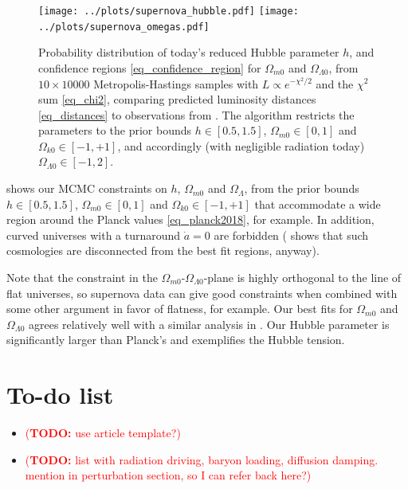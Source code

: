 \documentclass[10pt,a4paper]{article}
\newcommand\TODO[1]{\textcolor{red}{(\textbf{TODO:} #1)}}
\begin{document}
\begin{figure}[bh!]
	\centering
	\texttt{[image: ../plots/supernova\_hubble.pdf]}
	\texttt{[image: ../plots/supernova\_omegas.pdf]}
	\caption{%
		Probability distribution of today's reduced Hubble parameter $h$,
		and confidence regions \eqref{eq_confidence_region} for $\Omega_{m0}$ and $\Omega_{\Lambda0}$,
		from $10 \times 10000$ Metropolis-Hastings samples with $L \propto e^{-\chi^2/2}$ and the $\chi^2$ sum \eqref{eq_chi2},
		comparing predicted luminosity distances \eqref{eq_distances} to observations from \cite{betouleImprovedCosmologicalConstraints2014}.
		The algorithm restricts the parameters to the prior bounds $h \in [0.5, 1.5]$, $\Omega_{m0} \in [0, 1]$ and $\Omega_{k0} \in [-1, +1]$, and accordingly (with negligible radiation today) $\Omega_{\Lambda0} \in [-1, 2]$.
	}
	\label{fig_supernova_mcmc}
\end{figure}

 shows our MCMC constraints on $h$, $\Omega_{m0}$ and $\Omega_\Lambda$,
from the prior bounds $h \in [0.5, 1.5]$, $\Omega_{m0} \in [0, 1]$ and $\Omega_{k0} \in [-1, +1]$
that accommodate a wide region around the Planck values \eqref{eq_planck2018}, for example.
In addition, curved universes with a turnaround $\dot{a} = 0$ are forbidden
(\cite[Figure 11]{amanullahSpectraLightCurves2010} shows that such cosmologies are disconnected from the best fit regions, anyway).

Note that the constraint in the $\Omega_{m0}$-$\Omega_{\Lambda0}$-plane is highly orthogonal to the line of flat universes,
so supernova data can give good constraints when combined with some other argument in favor of flatness, for example.
Our best fits for $\Omega_{m0}$ and $\Omega_{\Lambda0}$ agrees relatively well with a similar analysis in \cite[Fig. 15]{betouleImprovedCosmologicalConstraints2014}.
Our Hubble parameter is significantly larger than Planck's and exemplifies the Hubble tension.

\clearpage

\section{To-do list}

\begin{itemize}
\item \TODO{use article template?}

\item \TODO{list with radiation driving, baryon loading, diffusion damping. mention in perturbation section, so I can refer back here?}
\end{itemize}

\clearpage
%
\printbibliography
\end{document}

